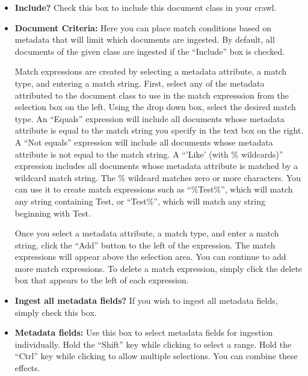 \begin{itemize}

\item \textbf{Include?}
Check this box to include this document class in your crawl.

\item \textbf{Document Criteria:}
Here you can place match conditions based on metadata that will limit
which documents are ingested. By default, all documents of the given
class are ingested if the ``Include'' box is checked.

Match expressions are created by selecting a metadata attribute, a
match type, and entering a match string. First, select any of the
metadata attributed to the document class to use in the match
expresssion from the selection box on the left. Using the drop down
box, select the desired match type. An ``Equals'' expression will
include all documents whose metadata attribute is equal to the match
string you specify in the text box on the right. A ``Not equals''
expression will include all documents whose metadata attribute is not
equal to the match string. A ``'Like' (with \% wildcards)'' expression
includes all documents whose metadata attribute is matched by a
wildcard match string. The \% wildcard matches zero or more
characters. You can use it to create match expressions such as
``\%Test\%'', which will match any string containing Test, or
``Test\%'', which will match any string beginning with Test.

Once you select a metadata attribute, a match type, and enter a match
string, click the ``Add'' button to the left of the expression. The
match expressions will appear above the selection area. You can
continue to add more match expressions. To delete a match expression,
simply click the delete box that appears to the left of each
expression.


\item \textbf{Ingest all metadata fields?}
If you wish to ingest all metadata fields, simply check this box.

\item \textbf{Metadata fields:}
Use this box to select metadata fields for ingestion
individually. Hold the ``Shift'' key while clicking to select a
range. Hold the ``Ctrl'' key while clicking to allow multiple
selections. You can combine these effects.


\end{itemize}


